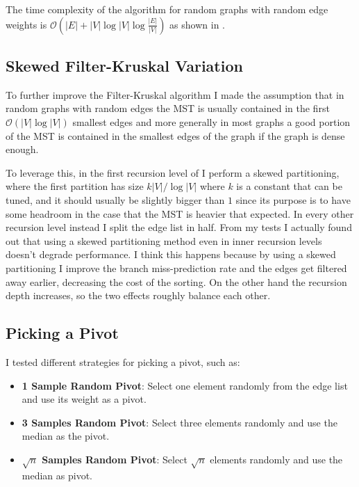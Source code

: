 \documentclass{article}
\begin{document}
The time complexity of the algorithm for random graphs with random edge weights is $\mathcal{O}(\lvert E\rvert + \lvert V\rvert \log \lvert V \rvert \log \frac{\lvert E \rvert}{\lvert V\rvert})$ as shown in \cite{filterkruskal}.

\subsection{Skewed Filter-Kruskal Variation}

To further improve the Filter-Kruskal algorithm I made the assumption that in random graphs with random edges the MST is usually contained in the first $\mathcal{O}(\lvert V\rvert\log \lvert V\rvert)$ smallest edges and more generally in most graphs a good portion of the MST is contained in the smallest edges of the graph if the graph is dense enough. 

To leverage this, in the first recursion level of  I perform a skewed partitioning, where the first partition has size $k\lvert V \rvert /\log \lvert V\rvert$ where $k$ is a constant that can be tuned, and it should usually be slightly bigger than $1$ since its purpose is to have some headroom in the case that the MST is heavier that expected. In every other recursion level instead I split the edge list in half. From my tests I actually found out that using a skewed partitioning method even in inner recursion levels doesn't degrade performance. I think this happens because by using a skewed partitioning I improve the branch miss-prediction rate and the edges get filtered away earlier, decreasing the cost of the sorting. On the other hand the recursion depth increases, so the two effects roughly balance each other.

\subsection{Picking a Pivot}

I tested different strategies for picking a pivot, such as:
\begin{itemize}
    \item \textbf{1 Sample Random Pivot}: Select one element randomly from the edge list and use its weight as a pivot.
    \item \textbf{3 Samples Random Pivot}: Select three elements randomly and use the median as the pivot.
    \item \textbf{$\sqrt n$ Samples Random Pivot}: Select $\sqrt n$ elements randomly and use the median as pivot.
\end{itemize}
\end{document}
